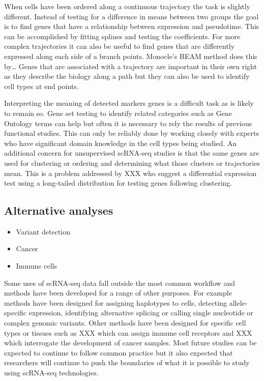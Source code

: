\documentclass[11pt,a4paper,titlepage,twoside,openright]{style/unimelbthesis}
\theoremstyle{definition}
\theoremstyle{definition}
\theoremstyle{definition}
\theoremstyle{remark}
\begin{document}
\begin{mainmatter}
When cells have been ordered along a continuous trajectory the task is slightly different. Instead of testing for a difference in means between two groups the goal is to find genes that have a relationship between expression and pseudotime. This can be accomplished by fitting splines and testing the coefficients. For more complex trajectories it can also be useful to find genes that are differently expressed along each side of a branch points. Monocle's BEAM method does this by\ldots{} Genes that are associated with a trajectory are important in their own right as they describe the biology along a path but they can also be used to identify cell types at end points.

Interpreting the meaning of detected markers genes is a difficult task as is likely to remain so. Gene set testing to identify related categories such as Gene Ontology terms can help but often it is necessary to rely the results of previous functional studies. This can only be reliably done by working closely with experts who have significant domain knowledge in the cell types being studied. An additional concern for unsupervised scRNA-seq studies is that the same genes are used for clustering or ordering and determining what those clusters or trajectories mean. This is a problem addressed by XXX who suggest a differential expression test using a long-tailed distribution for testing genes following clustering.

\hypertarget{alternative-analyses}{%
\subsection{Alternative analyses}\label{alternative-analyses}}

\begin{itemize}
\tightlist
\item
  Variant detection
\item
  Cancer
\item
  Immune cells
\end{itemize}

Some uses of scRNA-seq data fall outside the most common workflow and methods have been developed for a range of other purposes. For example methods have been designed for assigning haplotypes to cells, detecting allele-specific expression, identifying alternative splicing or calling single nucleotide or complex genomic variants. Other methods have been designed for specific cell types or tissues such as XXX which can assign immune cell receptors and XXX which interrogate the development of cancer samples. Most future studies can be expected to continue to follow common practice but it also expected that researchers will continue to push the boundaries of what it is possible to study using scRNA-seq technologies.


\end{mainmatter}
\end{document}
